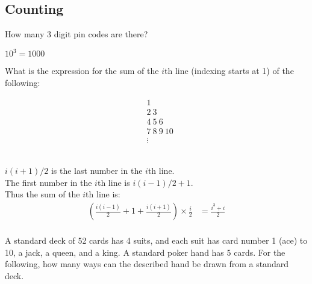 \documentclass[solutionorbox,answers]{exam}
\begin{document}
\begin{questions}
\section*{Counting}
\label{sec:counting}

\question
How many 3 digit pin codes are there?

\begin{solutionbox}{0.5in}
  $10^3 = 1000$
\end{solutionbox}

\question
What is the expression for the sum of the $i$th line (indexing starts at 1) of the following: \\
\begin{minipage}{0.1\textwidth}
\begin{align*}
 & 1        \\
 & 2\ 3      \\
 & 4\ 5\ 6    \\
 & 7\ 8\ 9\ 10 \\
 & \vdots
\end{align*}
\end{minipage}
\begin{minipage}{0.89\linewidth}
\begin{solutionbox}{2in} \\
  $i(i+1)/2$ is the last number in the $i$th line. \\
  The first number in the $i$th line is $i(i-1)/2 + 1$. \\
  Thus the sum of the $i$th line is: \\
  \begin{align*}
    (\frac{i(i-1)}{2} + 1 + \frac{i(i+1)}{2}) \times \frac{i}{2} &= \frac{i^3 + i}{2} \\ 
  \end{align*}
\end{solutionbox}
\end{minipage}

\question
A standard deck of 52 cards has 4 suits, and each suit has card number 1 (ace) to 10, a jack, a queen, and a king. A standard poker hand has 5 cards. For the following, how many ways can the described hand be drawn from a standard deck.

\end{questions}
\end{document}
